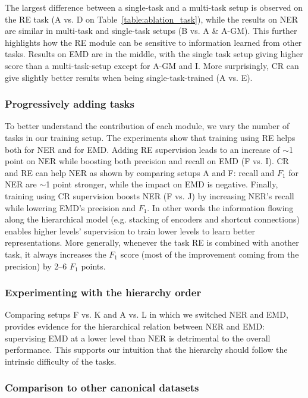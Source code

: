 \documentclass[letterpaper]{article} %
\begin{document}
The largest difference between a single-task and a multi-task setup is observed on the RE task (A vs. D on Table~\ref{table:ablation_task}), while the results on NER are similar in multi-task and single-task setups (B vs. A \& A-GM). This further highlights how the RE module can be sensitive to information learned from other tasks. Results on EMD are in the middle, with the single task setup giving higher score than a multi-task-setup except for A-GM and I. More surprisingly, CR can give slightly better results when being single-task-trained (A vs. E).

\subsubsection*{Progressively adding tasks}

To better understand the contribution of each module, we vary the number of tasks in our training setup. The experiments show that training using RE helps both for NER and for EMD. Adding RE supervision leads to an increase of $\sim$1 point on NER while boosting both precision and recall on EMD (F vs. I). CR and RE can help NER as shown by comparing setups A and F: recall and $F_{1}$ for NER are $\sim$1 point stronger, while the impact on EMD is negative. Finally, training using CR supervision boosts NER (F vs. J) by increasing NER's recall while lowering EMD's precision and $F_{1}$. In other words the information flowing along the hierarchical model (e.g. stacking of encoders and shortcut connections) enables higher levels' supervision to train lower levels to learn better representations. More generally, whenever the task RE is combined with another task, it always increases the $F_{1}$ score (most of the improvement coming from the precision) by 2--6 $F_{1}$ points. 

\subsubsection*{Experimenting with the hierarchy order}

Comparing setups F vs. K and A vs. L in which we switched NER and EMD, provides evidence for the hierarchical relation between NER and EMD: supervising EMD at a lower level than NER is detrimental to the overall performance. This supports our intuition that the hierarchy should follow the intrinsic difficulty of the tasks.

\subsubsection*{Comparison to other canonical datasets}
\end{document}
